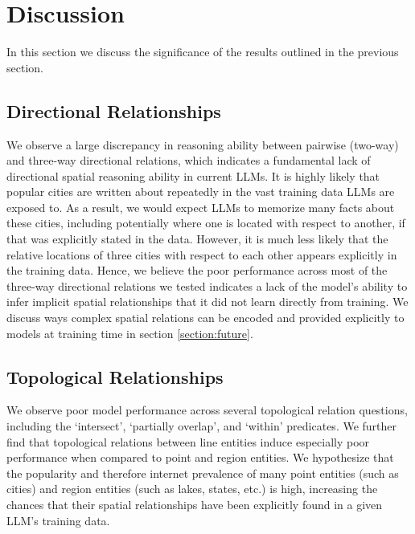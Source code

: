 \section{Discussion}
\label{section:discussion}


In this section we discuss the significance of the results outlined in the previous section.



\subsection{Directional Relationships}
We observe a large discrepancy in reasoning ability between pairwise (two-way) and three-way directional relations, which indicates a fundamental lack of directional spatial reasoning ability in current LLMs.
It is highly likely that popular cities are written about repeatedly in the vast training data LLMs are exposed to.
As a result, we would expect LLMs to memorize many facts about these cities, including potentially where one is located with respect to another, if that was explicitly stated in the data.
However, it is much less likely that the relative locations of three cities with respect to each other appears explicitly in the training data.
Hence, we believe the poor performance across most of the three-way directional relations we tested indicates a lack of the model's ability to infer implicit spatial relationships that it did not learn directly from training.
We discuss ways complex spatial relations can be encoded and provided explicitly to models at training time in section \ref{section:future}.


\subsection{Topological Relationships}
We observe poor model performance across several topological relation questions, including the `intersect', `partially overlap', and `within' predicates.
We further find that topological relations between line entities induce especially poor performance when compared to point and region entities.
We hypothesize that the popularity and therefore internet prevalence of many point entities (such as cities) and region entities (such as lakes, states, etc.) is high, increasing the chances that their spatial relationships have been explicitly found in a given LLM's training data.


